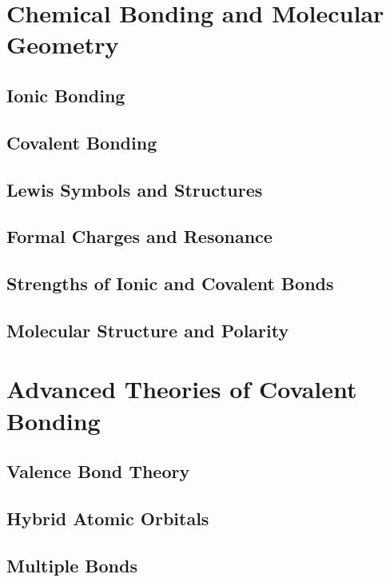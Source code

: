 \documentclass[12pt, openany, letterpaper]{memoir}
\begin{document}
\chapter{Chemical Bonding and Molecular Geometry}

\section{Ionic Bonding}

\section{Covalent Bonding}

\section{Lewis Symbols and Structures}

\section{Formal Charges and Resonance}

\section{Strengths of Ionic and Covalent Bonds}

\section{Molecular Structure and Polarity}

\chapter{Advanced Theories of Covalent Bonding}

\section{Valence Bond Theory}

\section{Hybrid Atomic Orbitals}

\section{Multiple Bonds}
\end{document}
